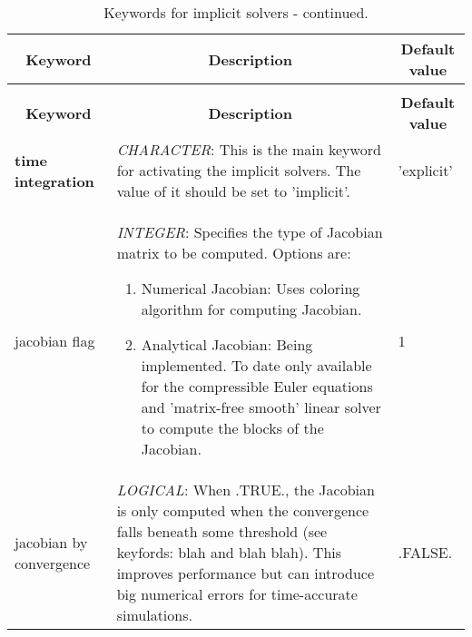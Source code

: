 \documentclass[a4paper,10pt]{report}
\begin{document}

\begin{longtable}{|p{4cm}|p{10cm}|p{2.2cm}|}
\caption{Keywords for implicit solvers.} \label{tab:implicitkey} \\
\hline
\multicolumn{1}{|c|}{\textbf{Keyword}} & \multicolumn{1}{c|}{\textbf{Description}} & \multicolumn{1}{c|}{\textbf{Default value}} \\ \hline
\endfirsthead

\caption{Keywords for implicit solvers - continued.} \\
\hline
\multicolumn{1}{|c|}{\textbf{Keyword}} & \multicolumn{1}{c|}{\textbf{Description}} & \multicolumn{1}{c|}{\textbf{Default value}} \\ \hline
\endhead

\textbf{time integration} & \textit{CHARACTER}: This is the main keyword for activating the implicit solvers. The value of it should be set to 'implicit'. & 'explicit' \\ \hline

jacobian flag           & \textit{INTEGER}: Specifies the type of Jacobian matrix to be computed. Options are:\
				\begin{enumerate}
					\item Numerical Jacobian: Uses coloring algorithm for computing Jacobian.
					\item Analytical Jacobian: Being implemented. To date only available for the compressible Euler equations and 'matrix-free smooth' linear solver to compute the blocks of the Jacobian.
					\end{enumerate}
										& 1 \\ \hline

jacobian by convergence & \textit{LOGICAL}: When .TRUE., the Jacobian is only computed when the convergence falls beneath some threshold (see keyfords: blah and blah blah). This improves performance but can introduce big numerical errors for time-accurate simulations.  & .FALSE. \\ \hline


\end{longtable}
\end{document}
